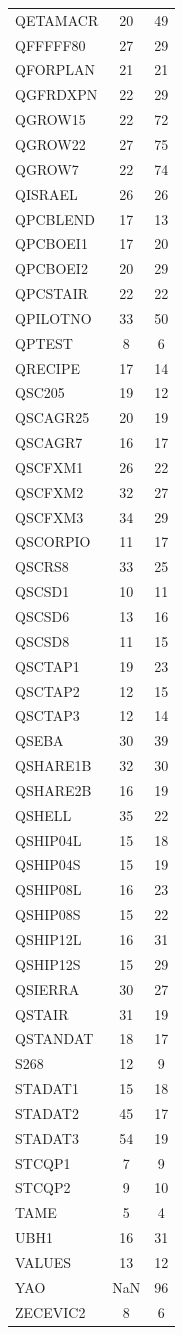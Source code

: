 \begin{longtable}{lcc}
QETAMACR & 20 & 49 \\
QFFFFF80 & 27 & 29 \\
QFORPLAN & 21 & 21 \\
QGFRDXPN & 22 & 29 \\
QGROW15 & 22 & 72 \\
QGROW22 & 27 & 75 \\
QGROW7 & 22 & 74 \\
QISRAEL & 26 & 26 \\
QPCBLEND & 17 & 13 \\
QPCBOEI1 & 17 & 20 \\
QPCBOEI2 & 20 & 29 \\
QPCSTAIR & 22 & 22 \\
QPILOTNO & 33 & 50 \\
QPTEST & 8 & 6 \\
QRECIPE & 17 & 14 \\
QSC205 & 19 & 12 \\
QSCAGR25 & 20 & 19 \\
QSCAGR7 & 16 & 17 \\
QSCFXM1 & 26 & 22 \\
QSCFXM2 & 32 & 27 \\
QSCFXM3 & 34 & 29 \\
QSCORPIO & 11 & 17 \\
QSCRS8 & 33 & 25 \\
QSCSD1 & 10 & 11 \\
QSCSD6 & 13 & 16 \\
QSCSD8 & 11 & 15 \\
QSCTAP1 & 19 & 23 \\
QSCTAP2 & 12 & 15 \\
QSCTAP3 & 12 & 14 \\
QSEBA & 30 & 39 \\
QSHARE1B & 32 & 30 \\
QSHARE2B & 16 & 19 \\
QSHELL & 35 & 22 \\
QSHIP04L & 15 & 18 \\
QSHIP04S & 15 & 19 \\
QSHIP08L & 16 & 23 \\
QSHIP08S & 15 & 22 \\
QSHIP12L & 16 & 31 \\
QSHIP12S & 15 & 29 \\
QSIERRA & 30 & 27 \\
QSTAIR & 31 & 19 \\
QSTANDAT & 18 & 17 \\
S268 & 12 & 9 \\
STADAT1 & 15 & 18 \\
STADAT2 & 45 & 17 \\
STADAT3 & 54 & 19 \\
STCQP1 & 7 & 9 \\
STCQP2 & 9 & 10 \\
TAME & 5 & 4 \\
UBH1 & 16 & 31 \\
VALUES & 13 & 12 \\
YAO & NaN & 96 \\
ZECEVIC2 & 8 & 6 \\
\end{longtable}
